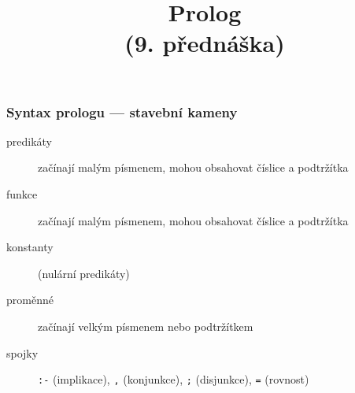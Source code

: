 \documentclass[red,professionalfont]{beamer}
\title[]{Prolog\\ (9. přednáška)}
\date[]{}
\theoremstyle{definition}
\newcommand{\0}{\mbox{${\bf 0}$}}
\begin{document}



\begin{frame}{} \titlepage
\end{frame}

\begin{frame}\frametitle{Syntax prologu --- stavební kameny}
\begin{description}
 \item[predikáty] začínají malým písmenem, mohou obsahovat číslice a podtržítka\pause
 \item[funkce] začínají malým písmenem, mohou obsahovat číslice a podtržítka\pause
 \item[konstanty] (nulární predikáty)\pause
 \item[proměnné] začínají velkým písmenem nebo podtržítkem\pause

 \item[spojky] {\tt :-} (implikace)\pause, {\tt ,} (konjunkce)\pause, {\tt ;} (disjunkce)\pause, {\tt =} (rovnost)
\end{description}
\end{frame}
\end{document}
